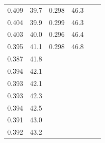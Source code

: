 \begin{table}[]
\begin{tabular}{|cccccc}
\multicolumn{1}{|c|}{0.409}   & \multicolumn{1}{c|}{39.7}     & \multicolumn{1}{c|}{0.298}     & \multicolumn{1}{c|}{46.3}     &                                &                               \\ \cline{1-4}
\multicolumn{1}{|c|}{0.404}   & \multicolumn{1}{c|}{39.9}     & \multicolumn{1}{c|}{0.299}     & \multicolumn{1}{c|}{46.3}     &                                &                               \\ \cline{1-4}
\multicolumn{1}{|c|}{0.403}   & \multicolumn{1}{c|}{40.0}     & \multicolumn{1}{c|}{0.296}     & \multicolumn{1}{c|}{46.4}     &                                &                               \\ \cline{1-4}
\multicolumn{1}{|c|}{0.395}   & \multicolumn{1}{c|}{41.1}     & \multicolumn{1}{c|}{0.298}     & \multicolumn{1}{c|}{46.8}     &                                &                               \\ \cline{1-4}
\multicolumn{1}{|c|}{0.387}   & \multicolumn{1}{c|}{41.8}     &                                &                               &                                &                               \\ \cline{1-2}
\multicolumn{1}{|c|}{0.394}   & \multicolumn{1}{c|}{42.1}     &                                &                               &                                &                               \\ \cline{1-2}
\multicolumn{1}{|c|}{0.393}   & \multicolumn{1}{c|}{42.1}     &                                &                               &                                &                               \\ \cline{1-2}
\multicolumn{1}{|c|}{0.393}   & \multicolumn{1}{c|}{42.3}     &                                &                               &                                &                               \\ \cline{1-2}
\multicolumn{1}{|c|}{0.394}   & \multicolumn{1}{c|}{42.5}     &                                &                               &                                &                               \\ \cline{1-2}
\multicolumn{1}{|c|}{0.391}   & \multicolumn{1}{c|}{43.0}     &                                &                               &                                &                               \\ \cline{1-2}
\multicolumn{1}{|c|}{0.392}   & \multicolumn{1}{c|}{43.2}     &                                &                               &                                &                               \\ \cline{1-2}
\end{tabular}
\end{table}